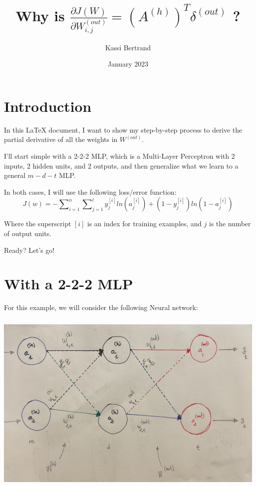\documentclass[12pt, letterpaper]{article}
\title{Why is $ \frac{\partial J(W)}{\partial W_{i,j}^{(out)}} = (A^{(h)})^{T} \delta^{(out)}$ ?}
\author{Kassi Bertrand}
\date{January 2023}
\begin{document}
\maketitle

\section{Introduction}
In this \LaTeX{} document, I want to show my step-by-step process
to derive the partial derivative of all the weights in $W^{(out)}$.

\vspace{5mm} %

I'll start simple with a 2-2-2 MLP, which is a Multi-Layer Perceptron
with 2 inputs, 2 hidden units, and 2 outputs, and then generalize
what we learn to a general $m-d-t$ MLP.

\vspace{5mm} %

In both cases, I will use the following loss/error function:
\[J(w) = -\sum\nolimits_{i = 1}^{n}\sum\nolimits_{j=1}^{t} y_j^{[i]} ln(a_j^{[i]}) + (1 - y_j^{[i]})ln(1 - a_j^{[i]})\]

Where the superscript $[i]$ is an index for training examples,
and $j$ is the number of output units.

\vspace{5mm} %

Ready? Let's go!

\pagebreak
\section{With a 2-2-2 MLP}

For this example, we will consider the following Neural network:

\begin{center}
    \includegraphics[width = 16cm, height = 9cm]{2-2-2-mlp.jpg}
\end{center}
\end{document}
